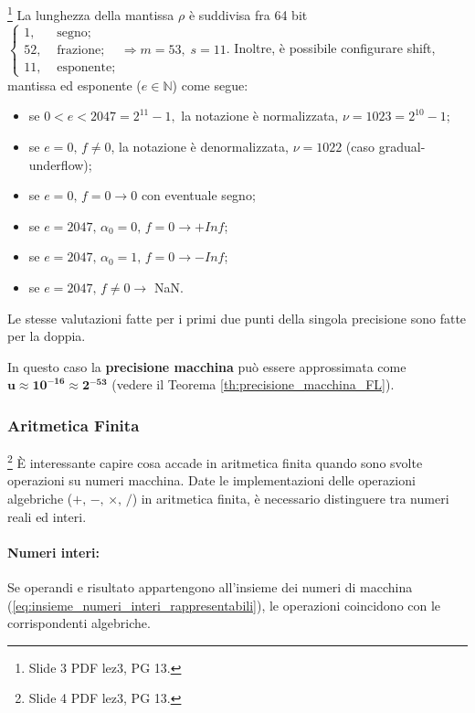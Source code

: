 \begin{definition}\footnote{Slide 3 PDF lez3, PG 13.}
	La lunghezza della mantissa $\rho$ è suddivisa fra 64 bit $\begin{cases}
		1, &\text{ segno};\\
		52, &\text{ frazione};\\
		11, &\text{ esponente};
	\end{cases}\Rightarrow m=53,\; s=11$.
	Inoltre, è possibile configurare shift, mantissa ed esponente ($e\in\mathbb N$) come segue:
	\begin{itemize}
		\item se $0<e<2047=2^{11}-1,$ la notazione è normalizzata, $\nu=1023=2^{10}-1$;
		\item se $e=0,\,f\neq 0$, la notazione è denormalizzata, $\nu=1022$ (caso gradual-underflow);
		\item se $e=0,\,f=0\rightarrow 0$ con eventuale segno;
		\item se $e=2047,\,\alpha_0=0,\,f=0\rightarrow +Inf$;
		\item se $e=2047,\,\alpha_0=1,\,f=0\rightarrow -Inf$;
		\item se $e=2047,\,f\neq 0 \rightarrow$ NaN.
	\end{itemize}
\end{definition}
Le stesse valutazioni fatte per i primi due punti della singola precisione sono fatte per la doppia.

\begin{remark}
	In questo caso la \textbf{precisione macchina} può essere approssimata come $\boldsymbol{u\approx 10^{-16}\approx 2^{-53}}$ (vedere il Teorema \ref{th:precisione_macchina_FL}).
\end{remark}

\subsubsection{Aritmetica Finita}\footnote{Slide 4 PDF lez3, PG 13.}
È interessante capire cosa accade in aritmetica finita quando sono svolte operazioni su numeri macchina. Date le implementazioni delle operazioni algebriche ($+,\, -,\,\times,\, \slash$) in aritmetica finita, è necessario distinguere tra numeri reali ed interi.

\paragraph{Numeri interi:} Se operandi e risultato appartengono all'insieme dei numeri di macchina (\ref{eq:insieme_numeri_interi_rappresentabili}), le operazioni coincidono con le corrispondenti algebriche.

